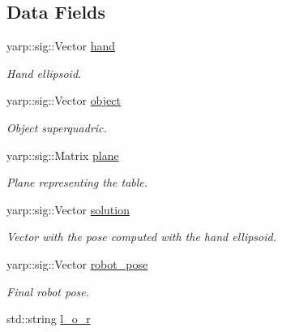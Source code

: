 \subsection*{Data Fields}
\begin{DoxyCompactItemize}
\item 
yarp\+::sig\+::\+Vector \hyperlink{classgrasping__NLP_abdf5321a362b6b73b54271d81e8cdd17}{hand}\label{classgrasping__NLP_abdf5321a362b6b73b54271d81e8cdd17}

\begin{DoxyCompactList}\small\item\em Hand ellipsoid. \end{DoxyCompactList}\item 
yarp\+::sig\+::\+Vector \hyperlink{classgrasping__NLP_aa9ee2758debcf6e9d06cf904394fb2df}{object}\label{classgrasping__NLP_aa9ee2758debcf6e9d06cf904394fb2df}

\begin{DoxyCompactList}\small\item\em Object superquadric. \end{DoxyCompactList}\item 
yarp\+::sig\+::\+Matrix \hyperlink{classgrasping__NLP_a64e8645d3e469a6d3d532fdccd082fcc}{plane}\label{classgrasping__NLP_a64e8645d3e469a6d3d532fdccd082fcc}

\begin{DoxyCompactList}\small\item\em Plane representing the table. \end{DoxyCompactList}\item 
yarp\+::sig\+::\+Vector \hyperlink{classgrasping__NLP_a331e541566751ac8cb85016d6878cc73}{solution}\label{classgrasping__NLP_a331e541566751ac8cb85016d6878cc73}

\begin{DoxyCompactList}\small\item\em Vector with the pose computed with the hand ellipsoid. \end{DoxyCompactList}\item 
yarp\+::sig\+::\+Vector \hyperlink{classgrasping__NLP_afe0fc80111d346ef60e17fc4c52439c9}{robot\+\_\+pose}\label{classgrasping__NLP_afe0fc80111d346ef60e17fc4c52439c9}

\begin{DoxyCompactList}\small\item\em Final robot pose. \end{DoxyCompactList}\item 
std\+::string \hyperlink{classgrasping__NLP_a7528c5c50e79a6992d7a8af1221d0e7d}{l\+\_\+o\+\_\+r}\label{classgrasping__NLP_a7528c5c50e79a6992d7a8af1221d0e7d}


\end{DoxyCompactItemize}
